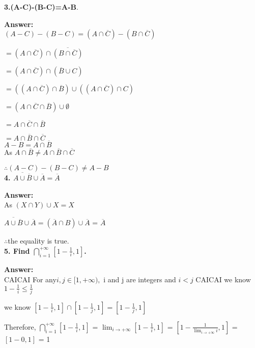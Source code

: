 \documentclass{article}
\begin{document}
\begin{large}
\textbf{3.(A-C)-(B-C)=A-B}.

\textbf{Answer:} \\

$(A-C)-(B-C) = (A \cap \overline{C}) - (B \cap \overline{C})$

            $= (A \cap \overline{C}) \cap \overline{(B \cap \overline{C})}$
            
            $= (A \cap \overline{C}) \cap (\overline{B} \cup C)$
            
            $= ((A \cap \overline{C}) \cap \overline{B}) \cup ((A \cap \overline{C}) \cap C)$
            
            $= (A \cap \overline{C} \cap \overline{B}) \cup \emptyset$
            
            $= A \cap \overline{C} \cap \overline{B}$
            
            $= A \cap \overline{B} \cap \overline{C}$\\

$A-B = A \cap \overline{B}$\\

As $A \cap \overline{B} \neq A \cap \overline{B} \cap \overline{C}$

$\therefore (A-C)-(B-C) \neq A-B$\\

\textbf{4. $\overline{A\cup \overline{B}} \cup \overline{A}=\overline{A}$}

\textbf{Answer:} \\

As $(X \cap Y) \cup X = X$

$\overline{A\cup \overline{B}} \cup \overline{A} = (\overline{A} \cap B) \cup \overline{A}$
                                                 = $\overline{A}$

$\therefore $the equality is true.\\

\textbf{5. Find $\bigcap\limits_{i=1}^{+\infty}[1-\frac{1}{i}, 1]$.}

\textbf{Answer:} \\

             CAICAI
For any$ i, j \in [1, +\infty),$ i and j are integers and $i < j$
                         CAICAI
we know $1 - \frac{1}{i} \le \frac{1}{j}$

we know $[1 - \frac{1}{i}, 1] \cap [1 - \frac{1}{j},1] = [1 - \frac{1}{j},1]$

Therefore, $\bigcap\limits_{i=1}^{+\infty}[1-\frac{1}{i}, 1]$ = $\lim_{i\to + \infty} [1 - \frac{1}{i},1]$
                                                              = $[1 - \frac{1}{\lim_{i\to + \infty}i}, 1]$
                                                              = $[1 - 0, 1]$
                                                              = 1\\



\end{large}
\end{document}
